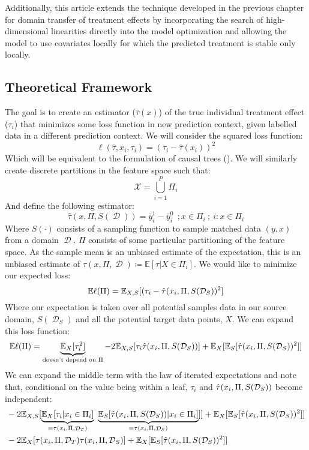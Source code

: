 \documentclass[a4paper,12pt]{article}
\DeclareMathOperator*{\D}{\mathcal{D}}
\begin{document}
Additionally, this article extends the technique developed in the previous chapter for domain transfer of treatment effects by incorporating the search of high-dimensional linearities directly into the model optimization and allowing the model to use covariates locally for which the predicted treatment is stable only locally.

\subsection{ Theoretical Framework }


The goal is to create an estimator ($\hat{\tau}(x)$) of the true individual treatment effect ($\tau_i$) that minimizes some loss function in new prediction context, given labelled data in a different prediction context. We will consider the squared loss function:
%
$$
\ell(\hat{\tau}, x_i, \tau_i) = (\tau_i - \hat{\tau}(x_i))^2
$$
%
Which will be equivalent to the formulation of causal trees (\cite{Athey2016}). We will similarly create discrete partitions in the feature space such that:
%
$$
\mathcal{X} = \bigcup\limits_{i=1}^{P} \Pi_i
$$
%
And define the following estimator:
%
$$
\hat{\tau}(x, \Pi, S(\D)) =  \bar{y}^1_i - \bar{y}^0_i \ \ ; x \in \Pi_i\ ; \ i : x \in \Pi_i
$$
%
Where $S(\cdot)$ consists of a sampling function to sample matched data $(y, x)$ from a domain $\D$. $\Pi$ consists of some particular partitioning of the feature space. As the sample mean is an unbiased estimate of the expectation, this is an unbiased estimate of $\tau(x,\Pi, \D) \coloneqq \mathbb{E}[\tau | X \in \Pi_i ]$. We would like to minimize our expected loss:
%
$$
\mathbb{E} \ell(\Pi) = \mathbb{E}_{X, S} [ (\tau_i - \hat{\tau}(x_i, \Pi, S(\mathcal{D}_S))^2  ]
$$
%
Where our expectation is taken over all potential samples data in our source domain, $S(\D_S)$ and all the potential target data points, $X$. We can expand this loss function:
%
$$
\mathbb{E} \ell(\Pi) = \underbrace{\mathbb{E}_{X} [ \tau_i^2]}_{\text{doesn't depend on $\Pi$}} - 2 \mathbb{E}_{X, S}[ \tau_i\hat{\tau}(x_i, \Pi, S(\mathcal{D}_S))] + \mathbb{E}_{X}[  \mathbb{E}_{S} [\hat{\tau}(x_i, \Pi, S(\mathcal{D}_S))^2 ]]
$$
%
We can expand the middle term with the law of iterated expectations and note that, conditional on the value being within a leaf, $\tau_i$ and $\hat{\tau}(x_i, \Pi, S(\mathcal{D}_S))$ become independent:
%
\begin{align*}
&-2 \Ex_{X,S}[ \underbrace{\Ex_{X}[ \tau_i | x_i \in \Pi_i]}_{= \tau(x_i, \Pi, \D_T)} \ \underbrace{\Ex_{S} [ \TTs | x_i \in \Pi_i]}_{= \tau(x_i, \Pi, \D_S)}] ] + \Ex_{X}[  \Ex_{S} [\TTs^2 ]]\\
&-2 \Ex_{X}[ \tau(x_i, \Pi, \mathcal{D}_T)  \tau(x_i, \Pi, \mathcal{D}_S) ] + \Ex_{X}[  \Ex_{S} [\TTs^2 ]]
\end{align*}
\end{document}
